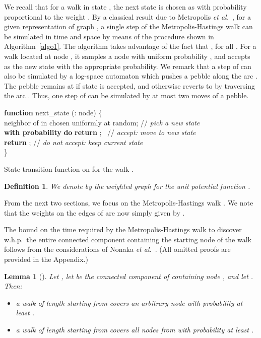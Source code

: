 \documentclass[11pt,a4paper]{article}
\newtheorem{definition}{Definition}
\newtheorem{lemma}{Lemma}
\newcommand{\etal}{\textsl{et al.}\xspace}
\renewcommand{\*}{\hspace*{5mm}}
\begin{document}
We recall that for a walk in state , the next state is chosen as  with probability proportional to the weight . By a classical result due to Metropolis \etal~\cite{M51}, for a given representation of graph , a single step of the Metropolis-Hastings walk  can be simulated in  time and space by means of the procedure shown in Algorithm~\ref{algo1}. The algorithm takes advantage of the fact that , for all . For a walk located at node , it samples a node  with uniform probability , and accepts  as the new state with the appropriate probability. We remark that a step of  can  also be simulated by a log-space automaton which pushes a pebble along the arc . The pebble remains at  if state  is accepted, and otherwise reverts to  by traversing the arc . Thus, one step of  can be simulated by at most two moves of a pebble.

\IncMargin{0.5em}
\begin{algorithm}
\textbf{function} next\_state (: node) \{\\
\*  neighbor of  in  chosen uniformly at random; \quad// \emph{pick a new state}\\
\* \textbf{with probability}  \textbf{do} \textbf{return} ; \ // \emph{accept: move to new state}\\
\* \textbf{return} ; \quad// \emph{do not accept: keep current state}\\
\}
\caption{State transition function on  for the walk .
}
\label{algo1}
\end{algorithm}

\begin{definition}
We denote by  the weighted graph  for the unit potential function .
\end{definition}


From the next two sections, we focus on the Metropolis-Hastings walk . We note that the weights on the edges of  are now simply given by .

The bound on the time required by the Metropolis-Hastings walk to discover w.h.p.\ the entire connected component containing the starting node of the walk follows from the considerations of Nonaka \etal~\cite{NOSY}. (All omitted proofs are provided in the Appendix.)

\begin{lemma}[\cite{NOSY}]\label{lemtwo}
Let , let  be the connected component of  containing node , and let . Then:
\begin{itemize}
\item a walk  of length  starting from  covers an arbitrary node  with probability at least .
\item a walk  of length  starting from  covers all nodes from  with probability at least .
\end{itemize}
\end{lemma}
\end{document}
